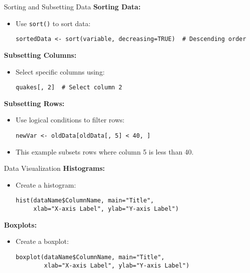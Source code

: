 \documentclass{beamer}
\begin{document}
\begin{frame}[fragile]{Sorting and Subsetting Data}
\textbf{Sorting Data:}
\begin{itemize}
    \item Use \texttt{sort()} to sort data:
    \begin{verbatim}
sortedData <- sort(variable, decreasing=TRUE)  # Descending order
    \end{verbatim}
\end{itemize}

\textbf{Subsetting Columns:}
\begin{itemize}
    \item Select specific columns using:
    \begin{verbatim}
quakes[, 2]  # Select column 2
    \end{verbatim}
\end{itemize}

\textbf{Subsetting Rows:}
\begin{itemize}
    \item Use logical conditions to filter rows:
    \begin{verbatim}
newVar <- oldData[oldData[, 5] < 40, ]
    \end{verbatim}
    \item This example subsets rows where column 5 is less than 40.
\end{itemize}
\end{frame}

\begin{frame}[fragile]{Data Visualization}
\textbf{Histograms:}
\begin{itemize}
    \item Create a histogram:
    \begin{verbatim}
hist(dataName$ColumnName, main="Title",
     xlab="X-axis Label", ylab="Y-axis Label")
    \end{verbatim}
\end{itemize}

\textbf{Boxplots:}
\begin{itemize}
    \item Create a boxplot:
    \begin{verbatim}
boxplot(dataName$ColumnName, main="Title",
        xlab="X-axis Label", ylab="Y-axis Label")
    \end{verbatim}
\end{itemize}
\end{frame}
\end{document}
